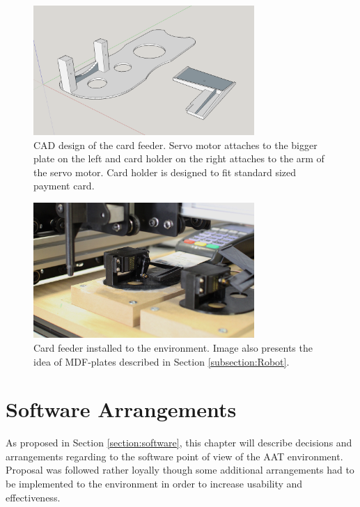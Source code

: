 \begin{figure}[ht]
  \begin{center}
    \includegraphics[width=8.4cm]{images/card_feeder.png}
    \caption{CAD design of the card feeder. Servo motor attaches to the bigger plate on the left and card holder on the right attaches to the arm of the servo motor. Card holder is designed to fit standard sized payment card.}
    \label{fig:card_feeder}
  \end{center}
\end{figure}

\begin{figure}[ht]
  \begin{center}
    \includegraphics[width=8.4cm]{images/card_feeder_2.jpg}
    \caption{Card feeder installed to the environment. Image also presents the idea of MDF-plates described in Section \ref{subsection:Robot}.}
    \label{fig:card_feeder_2}
  \end{center}
\end{figure}
\FloatBarrier

\section{Software Arrangements}
\label{section:Software arrangements}

As proposed in Section \ref{section:software}, this chapter will describe decisions and arrangements regarding to the software point of view of the AAT environment. Proposal was followed rather loyally though some additional arrangements had to be implemented to the environment in order to increase usability and effectiveness.

